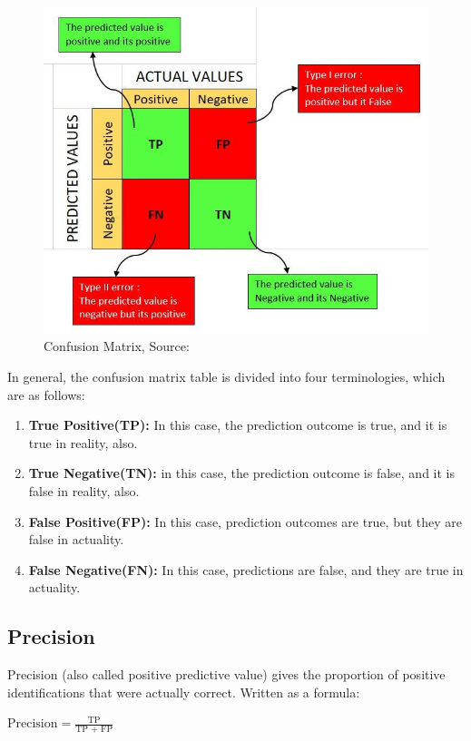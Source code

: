     \begin{figure}
        \centering
        \includegraphics[width=0.75\linewidth]{graphics//chapter3/typical confusion matrix.png}
        \caption{Confusion Matrix, Source: \cite{WEBSITE:cm-credit}}
        \label{fig:typical-confusion-matrix}
    \end{figure}

    In general, the confusion matrix table is divided into four terminologies, which are as follows:
    \begin{enumerate}
        \item \textbf{True Positive(TP):} In this case, the prediction outcome is true, and it is true in reality, also.
        \item \textbf{True Negative(TN):} in this case, the prediction outcome is false, and it is false in reality, also.
        \item \textbf{False Positive(FP):} In this case, prediction outcomes are true, but they are false in actuality.
        \item \textbf{False Negative(FN):} In this case, predictions are false, and they are true in actuality.
    \end{enumerate}



    
    \subsection{Precision}    
    Precision (also called positive predictive value) gives the proportion of positive identifications that were actually correct. Written as a formula\cite{precision-recall}:
    \begin{center}
        \(\displaystyle{\text{Precision} = \frac{\text{TP}}{\text{TP + FP}}}\) 
    \end{center}
    
